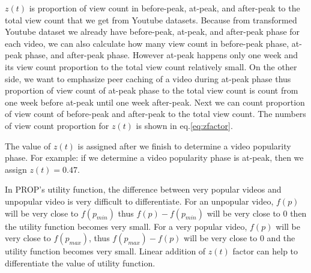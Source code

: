 $z(t)$ is proportion of view count in before-peak, at-peak, and after-peak to the total view count that we get from Youtube datasets.  
Because from transformed Youtube dataset we already have before-peak, at-peak, and after-peak phase for each video, we can also calculate how many view count in before-peak phase, at-peak phase, and after-peak phase.  
However at-peak happens only one week and its view count proportion to the total view count relatively small.
On the other side, we want to emphasize peer caching of a video during at-peak phase thus proportion of view count of at-peak phase to the total view count is count from one week before at-peak until one week after-peak.
Next we can count proportion of view count of before-peak and after-peak to the total view count.
The numbers of view count proportion for $z(t)$ is shown in eq.\ref{eq:zfactor}.

The value of $z(t)$ is assigned after we finish to determine a video popularity phase.  
For example: if we determine a video popularity phase is at-peak, then we assign $z(t)=0.47$.

In PROP's utility function, the difference between very popular videos and unpopular video is very difficult to differentiate. 
For an unpopular video, $f(p)$ will be very close to $f(p_{min})$ thus $f(p) - f(p_{min})$ will be very close to $0$ then the utility function becomes very small.
For a very popular video, $f(p)$ will be very close to $f(p_{max})$, thus $f(p_{max}) - f(p)$ will be very close to $0$ and the  utility function becomes very small.  
Linear addition of $z(t)$ factor can help to differentiate the value of utility function.

